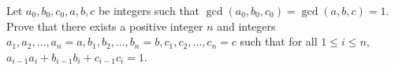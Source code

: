 Let $a_0,b_0,c_0,a,b,c$ be integers such that $\gcd(a_0,b_0,c_0)=\gcd(a,b,c)=1$. Prove that there exists a positive integer $n$ and integers $a_1,a_2,\ldots,a_n=a,b_1,b_2,\ldots,b_n=b,c_1,c_2,\ldots,c_n=c$ such that for all $1\le i\le n$, $a_{i-1}a_i+b_{i-1}b_i+c_{i-1}c_i=1$.

